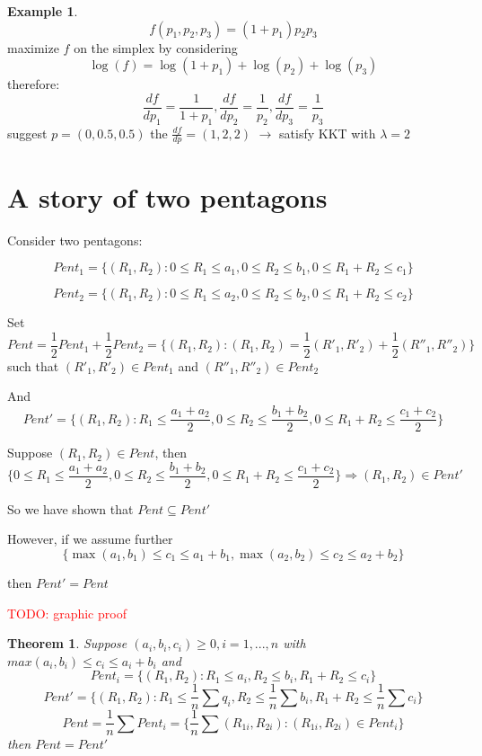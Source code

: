 \documentclass[twoside]{article}
\newtheorem{theorem}{Theorem}[section]
\theoremstyle{definition} %
\newtheorem{example}{Example}
\newcommand{\todo}[1]{\textcolor{red}{TODO: #1}}
\begin{document}
\begin{appendices}
\begin{example}
  \[f(p_1, p_2, p_3) = (1 + p_1) p_2 p_3 \]
  maximize $f$ on the simplex by considering
  \[ \log(f) = \log(1 + p_1) + \log(p_2) + \log(p_3) \]
  therefore:
  \[
    \frac{df}{dp_1} = \frac{1}{1 + p_1}, \frac{df}{dp_2} = \frac{1}{p_2}, \frac{df}{dp_3} = \frac{1}{p_3}
  \]
  suggest $p = (0, 0.5, 0.5)$ the $\frac{df}{dp} = (1, 2, 2)$
  $\rightarrow$ satisfy KKT with $\lambda = 2$
\end{example}


\section{A story of two pentagons}
Consider two pentagons:

\[
  Pent_1 = \{(R_1, R_2): 0 \leq R_1 \leq a_1, 0 \leq R_2 \leq b_1, 0 \leq R_1 + R_2 \leq c_1  \}
\]

\[
  Pent_2 = \{(R_1, R_2): 0 \leq R_1 \leq a_2, 0 \leq R_2 \leq b_2, 0 \leq R_1 + R_2 \leq c_2  \}
\]

Set
\[
  Pent = \frac{1}{2} Pent_1 + \frac{1}{2} Pent_2 = \{(R_1, R_2): (R_1, R_2) =  \frac{1}{2} (R'_1, R'_2) + \frac{1}{2} (R''_1, R''_2)  \}
\]
such that $ (R'_1, R'_2) \in Pent_1 $ and $ (R''_1, R''_2) \in Pent_2 $

And
\[
  Pent' = \{(R_1, R_2): R_1 \leq \frac{a_1 + a_2}{2}, 0 \leq R_2 \leq \frac{b_1 + b_2}{2}, 0 \leq R_1 + R_2 \leq \frac{c_1 + c_2}{2} \}
\]

Suppose $(R_1, R_2) \in Pent$, then
\[
  \{ 0 \leq R_1 \leq \frac{a_1 + a_2}{2}, 0 \leq R_2 \leq \frac{b_1 + b_2}{2}, 0 \leq R_1 + R_2 \leq \frac{c_1 + c_2}{2} \} \Rightarrow (R_1, R_2) \in Pent'
\]

So we have shown that $Pent \subseteq Pent'$

However, if we assume further
\[
  \{ \max(a_1, b_1) \leq c_1 \leq a_1 + b_1, \max(a_2, b_2) \leq c_2 \leq a_2 + b_2\}
\]

then $Pent' = Pent$

\todo{graphic proof}

\begin{theorem}
  Suppose $(a_i, b_i, c_i) \geq 0, i = 1 , ..., n$ with $max(a_i, b_i) \leq c_i \leq a_i + b_i$ and
  \[
    Pent_i = \{(R_1, R_2): R_1 \leq a_i, R_2 \leq b_i, R_1 + R_2 \leq c_i \}
  \]
  \[
    Pent' = \{(R_1, R_2): R_1 \leq \frac{1}{n} \sum q_i , R_2 \leq \frac{1}{n} \sum b_i, R_1 + R_2 \leq \frac{1}{n} \sum c_i \}
  \]
  \[
    Pent = \frac{1}{n} \sum Pent_i = \{\frac{1}{n} \sum (R_{1i}, R_{2i}) : (R_{1i}, R_{2i}) \in Pent_i \}
  \]
  then $Pent = Pent'$
\end{theorem}

\end{appendices}
\end{document}

